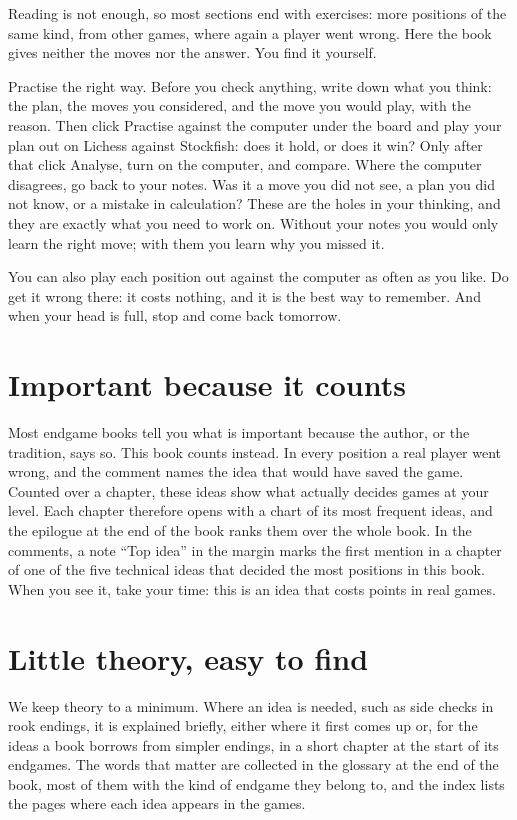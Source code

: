 Reading is not enough, so most sections end with exercises: more positions of the same kind,
from other games, where again a player went wrong. Here the book gives neither the moves nor the
answer. You find it yourself.

Practise the right way. Before you check anything, write down what you think: the plan, the moves
you considered, and the move you would play, with the reason. Then click Practise against the
computer under the board and play your plan out on Lichess against Stockfish: does it hold, or does it
win? Only after that click Analyse, turn on the computer, and compare. Where the computer disagrees,
go back to your notes.
Was it a move you did not see, a plan you did not know, or a mistake in calculation? These are the
holes in your thinking, and they are exactly what you need to work on. Without your notes you would
only learn the right move; with them you learn why you missed it.

You can also play each position out against the computer as often as you like. Do get it wrong
there: it costs nothing, and it is the best way to remember. And when your head is full, stop and
come back tomorrow.

\section*{Important because it counts}
Most endgame books tell you what is important because the author, or the tradition, says so. This
book counts instead. In every position a real player went wrong, and the comment names the idea
that would have saved the game. Counted over a chapter, these ideas show what actually decides games
at your level. Each chapter therefore opens with a chart of its most frequent ideas, and the epilogue
at the end of the book ranks them over the whole book. In the comments, a note ``Top idea'' in the
margin marks the first mention in a chapter of one of the five technical ideas that decided the most
positions in this book. When you see it, take your time: this is an idea that costs points in real
games.

\section*{Little theory, easy to find}
We keep theory to a minimum. Where an idea is needed, such as side checks in rook endings, it is
explained briefly, either where it first comes up or, for the ideas a book borrows from simpler
endings, in a short chapter at the start of its endgames. The words that matter are collected in the
glossary at the end of the book, most of them with the kind of endgame they belong to, and the index
lists the pages where each idea appears in the games.

